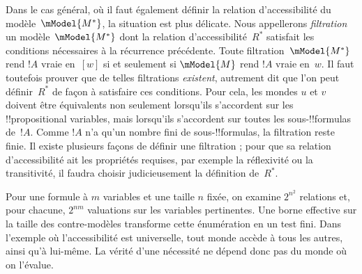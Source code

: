 \documentclass[../../../include/open-logic-section]{subfiles}
\begin{document}
Dans le cas général, où il faut également définir la relation
d'accessibilité du modèle~$\mModel{M^*}$, la situation est plus
délicate. Nous appellerons \emph{filtration} un modèle~$\mModel{M^*}$
dont la relation d'accessibilité~$R^*$ satisfait les conditions
nécessaires à la récurrence précédente. Toute filtration~$\mModel{M^*}$
rend $!A$ vraie en~$[w]$ si et seulement si $\mModel{M}$ rend
$!A$ vraie en~$w$. Il faut
toutefois prouver que de telles filtrations \emph{existent}, autrement
dit que l'on peut définir~$R^*$ de façon à satisfaire ces conditions.
Pour cela, les mondes $u$ et $v$ doivent être équivalents non seulement
lorsqu'ils s'accordent sur les !!{propositional variable}s, mais
lorsqu'ils s'accordent sur toutes les sous-!!{formula}s de~$!A$.
Comme $!A$ n'a qu'un nombre fini de sous-!!{formula}s, la filtration
reste finie. Il existe plusieurs façons de définir une filtration ;
pour que sa relation d'accessibilité ait les propriétés requises,
par exemple la réflexivité ou la transitivité, il faudra choisir
judicieusement la définition de~$R^*$.
\begin{explain}
Pour une formule à $m$ variables et une taille $n$ fixée,
on examine $2^{n^2}$ relations et, pour chacune,
$2^{nm}$ valuations sur les variables pertinentes. Une borne
effective sur la taille des contre-modèles transforme cette
énumération en un test fini. Dans l'exemple où l'accessibilité
est universelle, tout monde accède à tous les autres, ainsi
qu'à lui-même. La vérité d'une nécessité ne dépend donc pas
du monde où on l'évalue.
\end{explain}
\end{document}
